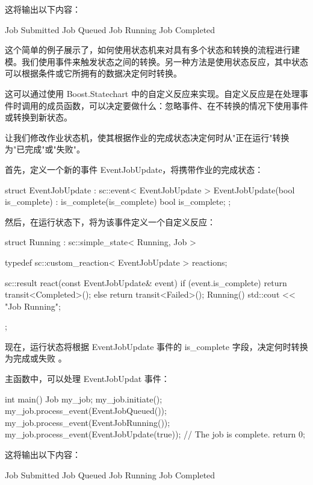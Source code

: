 这将输出以下内容：

\begin{shell}
Job Submitted
Job Queued
Job Running
Job Completed
\end{shell}

这个简单的例子展示了，如何使用状态机来对具有多个状态和转换的流程进行建模。我们使用事件来触发状态之间的转换。另一种方法是使用状态反应，其中状态可以根据条件或它所拥有的数据决定何时转换。

这可以通过使用 Boost.Statechart 中的自定义反应来实现。自定义反应是在处理事件时调用的成员函数，可以决定要做什么：忽略事件、在不转换的情况下使用事件或转换到新状态。

让我们修改作业状态机，使其根据作业的完成状态决定何时从"正在运行"转换为"已完成"或"失败"。

首先，定义一个新的事件 EventJobUpdate，将携带作业的完成状态：

\begin{cpp}
struct EventJobUpdate : sc::event< EventJobUpdate > {
    EventJobUpdate(bool is_complete) : is_complete(is_complete) {}
    bool is_complete;
};
\end{cpp}

然后，在运行状态下，将为该事件定义一个自定义反应：

\begin{cpp}
struct Running : sc::simple_state< Running, Job > {
    typedef sc::custom_reaction< EventJobUpdate > reactions;

    sc::result react(const EventJobUpdate& event) {
        if (event.is_complete) {
            return transit<Completed>();
        } else {
            return transit<Failed>();
        }
    }
    Running() { std::cout << "Job Running\n"; }
};
\end{cpp}

现在，运行状态将根据 EventJobUpdate 事件的 is\_complete 字段，决定何时转换为完成或失败
。

主函数中，可以处理 EventJobUpdat 事件：

\begin{cpp}
int main() {
    Job my_job;
    my_job.initiate();
    my_job.process_event(EventJobQueued());
    my_job.process_event(EventJobRunning());
    my_job.process_event(EventJobUpdate(true)); // The job is complete.
    return 0;
}
\end{cpp}

这将输出以下内容：

\begin{shell}
Job Submitted
Job Queued
Job Running
Job Completed
\end{shell}

